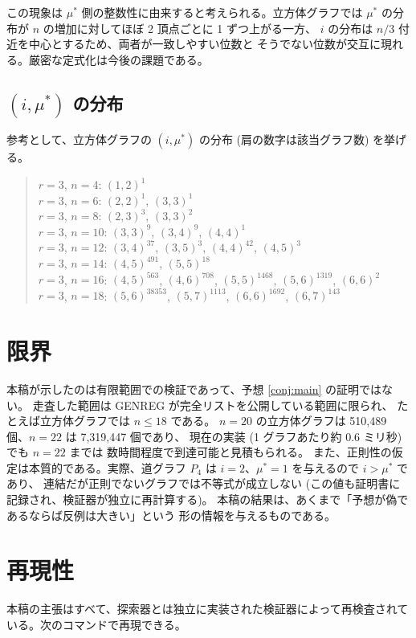 \documentclass[paper=a4,fontsize=10.5pt,jafontsize=10.5pt]{jlreq}
\theoremstyle{plain}
\theoremstyle{definition}
\begin{document}
この現象は $\mu^*$ 側の整数性に由来すると考えられる。立方体グラフでは
$\mu^*$ の分布が $n$ の増加に対してほぼ 2 頂点ごとに 1 ずつ上がる一方、
$i$ の分布は $n/3$ 付近を中心とするため、両者が一致しやすい位数と
そうでない位数が交互に現れる。厳密な定式化は今後の課題である。

\subsection{$(i,\mu^*)$ の分布}

参考として、立方体グラフの $(i,\mu^*)$ の分布 (肩の数字は該当グラフ数) を挙げる。

\begin{quote}\small
$r=3$, $n=4$: $(1,2)^{1}$ \\ $r=3$, $n=6$: $(2,2)^{1}$, $(3,3)^{1}$ \\ $r=3$, $n=8$: $(2,3)^{3}$, $(3,3)^{2}$ \\ $r=3$, $n=10$: $(3,3)^{9}$, $(3,4)^{9}$, $(4,4)^{1}$ \\ $r=3$, $n=12$: $(3,4)^{37}$, $(3,5)^{3}$, $(4,4)^{42}$, $(4,5)^{3}$ \\ $r=3$, $n=14$: $(4,5)^{491}$, $(5,5)^{18}$ \\ $r=3$, $n=16$: $(4,5)^{563}$, $(4,6)^{708}$, $(5,5)^{1468}$, $(5,6)^{1319}$, $(6,6)^{2}$ \\ $r=3$, $n=18$: $(5,6)^{38353}$, $(5,7)^{1113}$, $(6,6)^{1692}$, $(6,7)^{143}$
\end{quote}

\section{限界}

本稿が示したのは有限範囲での検証であって、予想 \ref{conj:main} の証明ではない。
走査した範囲は GENREG が完全リストを公開している範囲に限られ、
たとえば立方体グラフでは $n \le 18$ である。
$n = 20$ の立方体グラフは 510,489 個、$n=22$ は 7,319,447 個であり、
現在の実装 (1 グラフあたり約 0.6 ミリ秒) でも $n = 22$ までは
数時間程度で到達可能と見積もられる。
また、正則性の仮定は本質的である。実際、道グラフ $P_4$ は
$i = 2$、$\mu^* = 1$ を与えるので $i > \mu^*$ であり、
連結だが正則でないグラフでは不等式が成立しない
(この値も証明書に記録され、検証器が独立に再計算する)。
本稿の結果は、あくまで「予想が偽であるならば反例は大きい」という
形の情報を与えるものである。


\section*{再現性}
本稿の主張はすべて、探索器とは独立に実装された検証器によって再検査されている。次のコマンドで再現できる。
\end{document}
